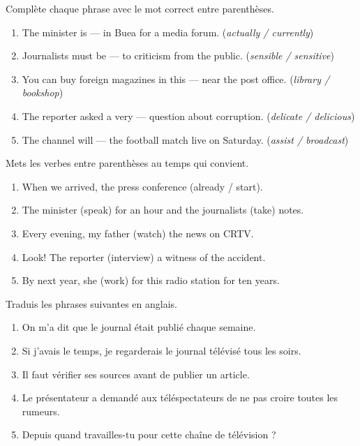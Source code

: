 \documentclass[11pt]{article}
\newcounter{popsec}
\newcounter{popsub}
\newcommand{\courssub}[1]{%
  \stepcounter{popsub}%
  \par\vspace{9pt}\noindent{\popxbold\fontsize{11.5}{13}\selectfont\color{popink}{\color{poporange}\thepopsec.\thepopsub}\hspace{6pt}#1}\par\nopagebreak\vspace{4pt}
}
\begin{document}
\begin{exercice}
Complète chaque phrase avec le mot correct entre parenthèses.

\begin{enumerate}
\item The minister is --- in Buea for a media forum. (\emph{actually / currently})
\item Journalists must be --- to criticism from the public. (\emph{sensible / sensitive})
\item You can buy foreign magazines in this --- near the post office. (\emph{library / bookshop})
\item The reporter asked a very --- question about corruption. (\emph{delicate / delicious})
\item The channel will --- the football match live on Saturday. (\emph{assist / broadcast})
\end{enumerate}
\end{exercice}

\begin{exercice}
Mets les verbes entre parenthèses au temps qui convient.

\begin{enumerate}
\item When we arrived, the press conference (already / start).
\item The minister (speak) for an hour and the journalists (take) notes.
\item Every evening, my father (watch) the news on CRTV.
\item Look! The reporter (interview) a witness of the accident.
\item By next year, she (work) for this radio station for ten years.
\end{enumerate}
\end{exercice}

\courssub{Je m'entraîne}

\begin{exercice}[Traduction]
Traduis les phrases suivantes en anglais.

\begin{enumerate}
\item On m'a dit que le journal était publié chaque semaine.
\item Si j'avais le temps, je regarderais le journal télévisé tous les soirs.
\item Il faut vérifier ses sources avant de publier un article.
\item Le présentateur a demandé aux téléspectateurs de ne pas croire toutes les rumeurs.
\item Depuis quand travailles-tu pour cette chaîne de télévision ?
\end{enumerate}
\end{exercice}
\end{document}
